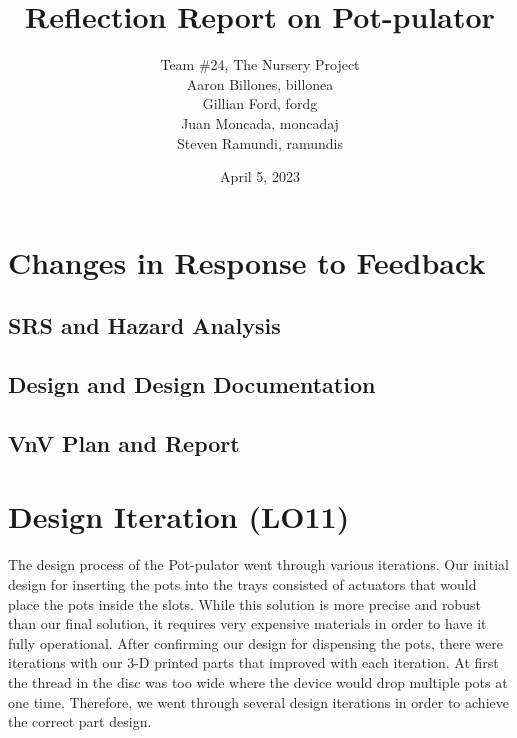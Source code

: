 \documentclass{article}
\title{Reflection Report on Pot-pulator}
\author{Team \#24, The Nursery Project\\Aaron Billones, billonea\\Gillian Ford, fordg\\Juan Moncada, moncadaj\\Steven Ramundi, ramundis}
\date{April 5, 2023}
\begin{document}
\maketitle


\section{Changes in Response to Feedback}



\subsection{SRS and Hazard Analysis}

\subsection{Design and Design Documentation}

\subsection{VnV Plan and Report}

\section{Design Iteration (LO11)}

The design process of the Pot-pulator went through various iterations.
Our initial design for inserting the pots into the trays consisted of 
actuators that would place the pots inside the slots. While this solution 
is more precise and robust than our final solution, it requires very expensive
materials in order to have it fully operational. After confirming our design for dispensing the pots,
there were iterations with our 3-D printed parts that improved with each iteration.
At first the thread in the disc was too wide where the device would drop multiple pots at one time.
Therefore, we went through several design iterations in order to achieve the correct part design.\\\\
\end{document}

